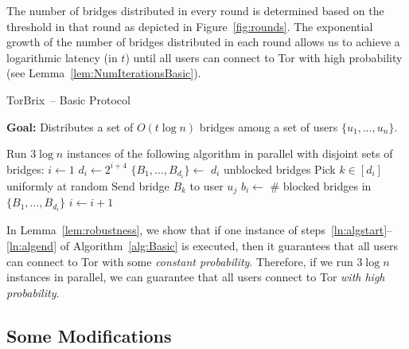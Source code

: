 \documentclass[letterpaper,twocolumn,10pt]{article}
\newcommand{\algFont}{\fontsize{10}{13}\selectfont}
\newcommand{\sfsize}{\fontsize{0.73\baselineskip}{0.73\baselineskip}\selectfont}
\newcommand{\sans}[1]{\textsf{\sfsize \mbox{#1}}}
\newcommand{\brix}{\sans{TorBrix}\xspace}
\begin{document}
The number of bridges distributed in every round is determined based on the threshold in that round as depicted in Figure~\ref{fig:rounds}. The exponential growth of the number of bridges distributed in each round allows us to achieve a logarithmic latency (in $t$) until all users can connect to Tor with high probability (see Lemma~\ref{lem:NumIterationsBasic}). 
\begin{algorithm}[t]
	\caption{\brix~-- Basic Protocol}
	\label{alg:Basic}
	\vspace{0.4em}
	\textbf{Goal:} Distributes a set of $O(t\log{n})$ bridges among a set of users $\{u_1,...,u_n\}$.
	
	\algFont \vspace{2pt}
	\begin{algorithmic}[1]
		\Statex \hspace{-\algorithmicindent} Run $3\log{n}$ instances of the following algorithm in parallel with disjoint sets of bridges:
		\State ${i \gets 1}$  \label{ln:algstart}
		\While{\True}
			\State $d_i \gets 2^{i+4}$	\label{ln:forparallel} \label{ln:ifreasonable}
				\State $\{B_1,...,B_{d_i}\} \gets$ $d_i$ unblocked bridges \label{ln:RecruitBridges}						
					
					\State Pick $k \in [d_i]$ uniformly at random 
					\State Send bridge $B_{k}$ to user $u_j$				
				\EndFor			\label{ln:IterationEnd}
			 \label{ln:ConditionSimple} %
				\State $b_i \gets$ \# blocked bridges in $\{B_1, ..., B_{d_i}\}$
			\EndWhile
			\State $i \gets i+1$ \label{ln:IncrementSimple}
		\EndWhile	\label{ln:algend}
	\end{algorithmic}	
\end{algorithm}
In Lemma~\ref{lem:robustness}, we show that if one instance of steps~\ref{ln:algstart}--\ref{ln:algend} of Algorithm~\ref{alg:Basic} is executed, then it guarantees that all users can connect to Tor with some \emph{constant probability}. Therefore, if we run $3\log{n}$ instances in parallel, we can guarantee that all users connect to Tor \emph{with high probability}.

\subsection{Some Modifications}
\end{document}

